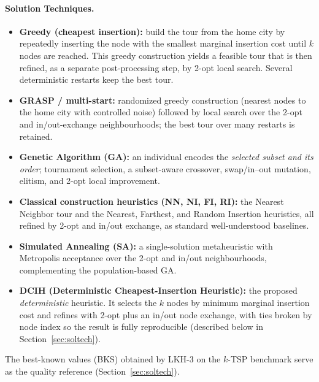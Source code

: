 \documentclass[conference]{IEEEtran}
\begin{document}
\paragraph{Solution Techniques.}
\begin{itemize}
  \item \textbf{Greedy (cheapest insertion):} build the tour from the home city by repeatedly inserting the node with the smallest marginal insertion cost until $k$ nodes are reached. This greedy construction yields a feasible tour that is then refined, as a separate post-processing step, by 2-opt local search. Several deterministic restarts keep the best tour.
  \item \textbf{GRASP / multi-start:} randomized greedy construction (nearest nodes to the home city with controlled noise) followed by local search over the 2-opt and in/out-exchange neighbourhoods; the best tour over many restarts is retained.
  \item \textbf{Genetic Algorithm (GA):} an individual encodes the \emph{selected subset and its order}; tournament selection, a subset-aware crossover, swap/in--out mutation, elitism, and 2-opt local improvement.
  \item \textbf{Classical construction heuristics (NN, NI, FI, RI):} the Nearest Neighbor tour and the Nearest, Farthest, and Random Insertion heuristics, all refined by 2-opt and in/out exchange, as standard well-understood baselines.
  \item \textbf{Simulated Annealing (SA):} a single-solution metaheuristic with Metropolis acceptance over the 2-opt and in/out neighbourhoods, complementing the population-based GA.
  \item \textbf{DCIH (Deterministic Cheapest-Insertion Heuristic):} the proposed \emph{deterministic} heuristic. It selects the $k$ nodes by minimum marginal insertion cost and refines with 2-opt plus an in/out node exchange, with ties broken by node index so the result is fully reproducible (described below in Section~\ref{sec:soltech}).
\end{itemize}
The best-known values (BKS) obtained by LKH-3 on the $k$-TSP benchmark serve as the quality reference (Section~\ref{sec:soltech}).
\end{document}
